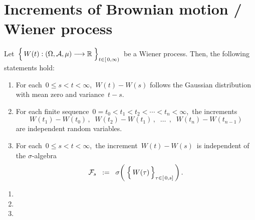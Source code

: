 

\section{Increments of Brownian motion / Wiener process}
\setcounter{theorem}{0}
\setcounter{equation}{0}


\renewcommand{\theenumi}{\roman{enumi}}
\renewcommand{\labelenumi}{\textnormal{(\theenumi)}$\;\;$}


\begin{proposition}
\label{WienerProcessIncrements}
\mbox{}
\vskip 0.2cm
\noindent
Let
\,$\left\{\,\overset{{\color{white}.}}{W}(t) : (\Omega,\mathcal{A},\mu) \longrightarrow \Re \;\right\}_{t \in[\,0,\infty)}$\,
be a Wiener process.
Then, the following statements hold:
\begin{enumerate}
\item
	For each \,$0 \leq s < t < \infty$,\,
	$W(t) - W(s)$ follows the Gaussian distribution with mean zero and variance \,$t-s$.	
\item
	For each finite sequence \,$0 = t_{0} < t_{1} < t_{2} < \cdots < t_{n} < \infty$,\,
	the increments
	\begin{equation*}
	W(t_{1}) - W(t_{0})\,,\;\;
	W(t_{2}) - W(t_{1})\,,\;\;
	\ldots\;\,,\;\;
	W(t_{n}) - W(t_{n-1})
	\end{equation*}
	are independent random variables.
\item
	For each \,$0 \leq s < t < \infty$,\,
	the increment \,$W(t) - W(s)$\,
	is independent of the $\sigma$-algebra
	\begin{equation*}
	\mathcal{F}_{s}
	\;\; := \;\;
		\sigma\!\left(\;\left\{\,
			\overset{{\color{white}.}}{W}(\tau)
			\,\right\}_{\tau \in [\,0,s]}\,\right).
	\end{equation*}
\end{enumerate}
\end{proposition}
\proof
\begin{enumerate}
\item
\item
\item
\end{enumerate}

